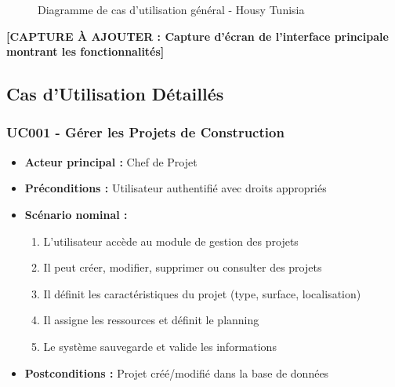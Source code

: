 \begin{figure}[h]
\caption{Diagramme de cas d'utilisation général - Housy Tunisia}
\end{figure}

\textbf{[CAPTURE À AJOUTER : Capture d'écran de l'interface principale montrant les fonctionnalités]}

\subsection{Cas d'Utilisation Détaillés}

\subsubsection{UC001 - Gérer les Projets de Construction}

\begin{itemize}
    \item \textbf{Acteur principal :} Chef de Projet
    \item \textbf{Préconditions :} Utilisateur authentifié avec droits appropriés
    \item \textbf{Scénario nominal :}
    \begin{enumerate}
        \item L'utilisateur accède au module de gestion des projets
        \item Il peut créer, modifier, supprimer ou consulter des projets
        \item Il définit les caractéristiques du projet (type, surface, localisation)
        \item Il assigne les ressources et définit le planning
        \item Le système sauvegarde et valide les informations
    \end{enumerate}
    \item \textbf{Postconditions :} Projet créé/modifié dans la base de données
\end{itemize}

